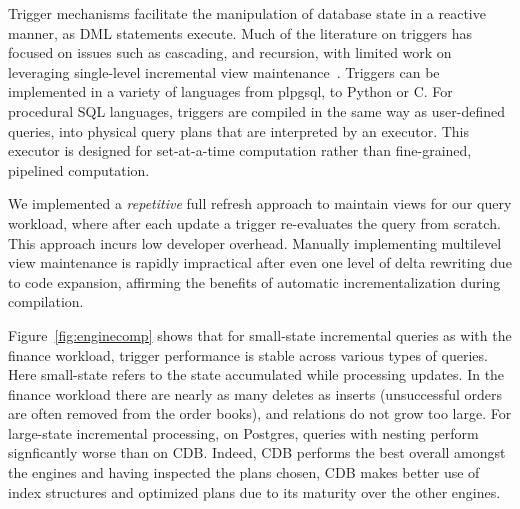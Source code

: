 \vspace{1mm}
Trigger mechanisms facilitate the manipulation of database state in a reactive
manner, as DML statements execute.
Much of the literature on triggers has focused on issues such as cascading, and
recursion, with limited work on leveraging single-level incremental view
maintenance~\cite{baralis-rids95}.
Triggers can be implemented in a variety of languages from plpgsql, to Python or
C. For procedural SQL languages, triggers are compiled in the same
way as user-defined queries, into physical query plans that are interpreted by
an executor.
This executor is designed for set-at-a-time computation rather than
fine-grained, pipelined computation. 

We implemented a \textit{repetitive} full refresh approach to maintain views for
our query workload, where after each update a trigger re-evaluates the query
from scratch. This approach incurs low developer overhead. Manually implementing
multilevel view maintenance is rapidly impractical after even one level of delta
rewriting due to code expansion, affirming the benefits of automatic
incrementalization during compilation.

Figure~\ref{fig:enginecomp} shows that for small-state incremental queries
as with the finance workload, trigger performance is stable across various types
of queries. Here small-state refers to the state accumulated while
processing updates. In the finance workload there are nearly as
many deletes as inserts (unsuccessful orders are often removed from the order
books), and relations do not grow too large. For large-state incremental
processing, on Postgres, queries with nesting perform signficantly worse than on
CDB. Indeed, CDB performs the best overall amongst the engines and having
inspected the plans chosen, CDB makes better use of index structures and
optimized plans due to its maturity over the other engines.

